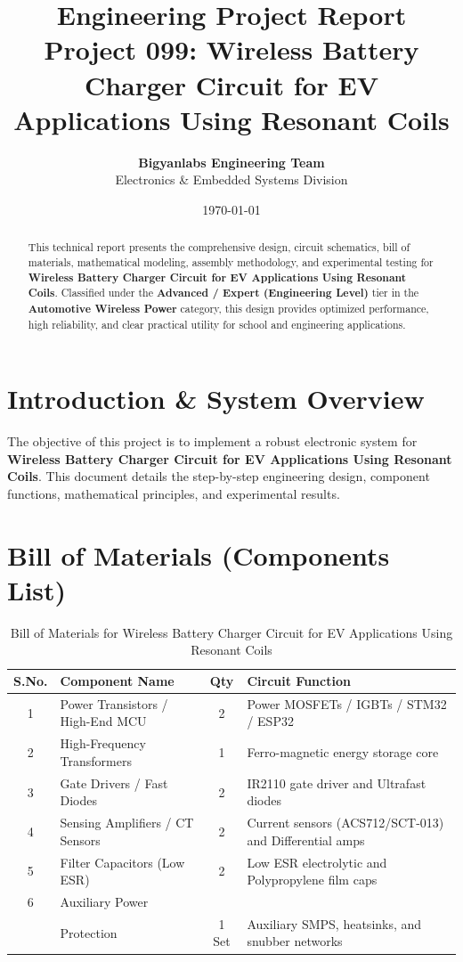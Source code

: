 \documentclass[11pt,a4paper]{article}
\title{\textbf{\Huge Engineering Project Report}\\[0.5em] \Large Project 099: Wireless Battery Charger Circuit for EV Applications Using Resonant Coils}
\author{\textbf{Bigyanlabs Engineering Team}\\ Electronics \& Embedded Systems Division}
\date{\today}
\begin{document}
\maketitle
\thispagestyle{empty}

\begin{abstract}
This technical report presents the comprehensive design, circuit schematics, bill of materials, mathematical modeling, assembly methodology, and experimental testing for \textbf{Wireless Battery Charger Circuit for EV Applications Using Resonant Coils}. Classified under the \textbf{Advanced / Expert (Engineering Level)} tier in the \textbf{Automotive Wireless Power} category, this design provides optimized performance, high reliability, and clear practical utility for school and engineering applications.
\end{abstract}

\newpage
\tableofcontents
\newpage

\section{Introduction \& System Overview}
The objective of this project is to implement a robust electronic system for \textbf{Wireless Battery Charger Circuit for EV Applications Using Resonant Coils}. This document details the step-by-step engineering design, component functions, mathematical principles, and experimental results.

\section{Bill of Materials (Components List)}
\begin{table}[h!]
\centering
\caption{Bill of Materials for Wireless Battery Charger Circuit for EV Applications Using Resonant Coils}
\vspace{0.5em}
\begin{tabular}{clcp{7cm}}
\toprule
\textbf{S.No.} & \textbf{Component Name} & \textbf{Qty} & \textbf{Circuit Function} \\
\midrule
1 & Power Transistors / High-End MCU & 2 & Power MOSFETs / IGBTs / STM32 / ESP32 \\
2 & High-Frequency Transformers & 1 & Ferro-magnetic energy storage core \\
3 & Gate Drivers / Fast Diodes & 2 & IR2110 gate driver and Ultrafast diodes \\
4 & Sensing Amplifiers / CT Sensors & 2 & Current sensors (ACS712/SCT-013) and Differential amps \\
5 & Filter Capacitors (Low ESR) & 2 & Low ESR electrolytic and Polypropylene film caps \\
6 & Auxiliary Power \\& Protection & 1 Set & Auxiliary SMPS, heatsinks, and snubber networks \\
\bottomrule
\end{tabular}
\end{table}
\end{document}
